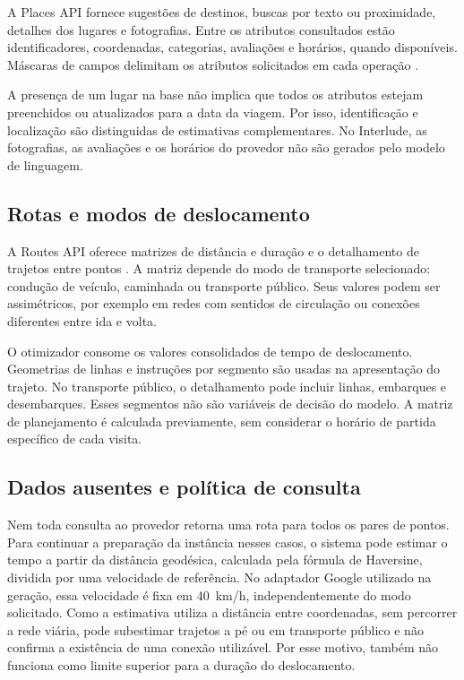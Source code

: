 A Places API fornece sugestões de destinos, buscas por texto ou proximidade, detalhes dos lugares e fotografias. Entre os atributos consultados estão identificadores, coordenadas, categorias, avaliações e horários, quando disponíveis. Máscaras de campos delimitam os atributos solicitados em cada operação \cite{google_places_api}.

A presença de um lugar na base não implica que todos os atributos estejam preenchidos ou atualizados para a data da viagem. Por isso, identificação e localização são distinguidas de estimativas complementares. No Interlude, as fotografias, as avaliações e os horários do provedor não são gerados pelo modelo de linguagem.

\subsection{Rotas e modos de deslocamento}

A Routes API oferece matrizes de distância e duração e o detalhamento de trajetos entre pontos \cite{google_routes_api}. A matriz depende do modo de transporte selecionado: condução de veículo, caminhada ou transporte público. Seus valores podem ser assimétricos, por exemplo em redes com sentidos de circulação ou conexões diferentes entre ida e volta.

O otimizador consome os valores consolidados de tempo de deslocamento. Geometrias de linhas e instruções por segmento são usadas na apresentação do trajeto. No transporte público, o detalhamento pode incluir linhas, embarques e desembarques. Esses segmentos não são variáveis de decisão do modelo. A matriz de planejamento é calculada previamente, sem considerar o horário de partida específico de cada visita.

\subsection{Dados ausentes e política de consulta}
\label{sec:dados-ausentes}

Nem toda consulta ao provedor retorna uma rota para todos os pares de pontos. Para continuar a preparação da instância nesses casos, o sistema pode estimar o tempo a partir da distância geodésica, calculada pela fórmula de Haversine, dividida por uma velocidade de referência. No adaptador Google utilizado na geração, essa velocidade é fixa em 40~km/h, independentemente do modo solicitado. Como a estimativa utiliza a distância entre coordenadas, sem percorrer a rede viária, pode subestimar trajetos a pé ou em transporte público e não confirma a existência de uma conexão utilizável. Por esse motivo, também não funciona como limite superior para a duração do deslocamento.

